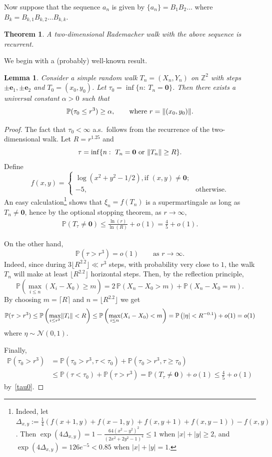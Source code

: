 \documentclass[12pt]{article}
\newtheorem{theorem}{Theorem}
\newtheorem{lemma}{Lemma}
\renewcommand\P{\mathbb{P}}
\newcommand\Z{\mathbb{Z}}
\newcommand\be{\mathbf{e}}
\DeclarePairedDelimiter{\norm}{\lVert}{\rVert}
\begin{document}
Now suppose that the sequence ${a_n}$ is given by $\{a_n\}=B_1 B_2\dots$ where $B_k=B_{k,1} B_{k,2}\dots B_{k,k}$.
\begin{theorem}\label{Tex}
A two-dimensional Rademacher walk with the above sequence is recurrent.
\end{theorem}
We begin with a (probably) well-known result.
\begin{lemma}\label{lemmacube}
Consider a simple random walk $T_n=(X_n,Y_n)$ on $\Z^2$ with steps $\pm\be_1,\pm\be_2$ and $T_0=(x_0,y_0)$. Let $\tau_0=\inf\{n:\ T_n=\mathbf{0}\}$. Then there exists a universal constant $\alpha>0$ such that
$$
\P(\tau_0\le r^3)\ge \alpha, \qquad\text{where }r=\norm{(x_0,y_0)}.
$$
\end{lemma}
\begin{proof}
The fact that $\tau_0<\infty$ a.s.\ follows from the recurrence of the two-dimensional walk. Let $R=r^{1.25}$ and
$$
\tau=\inf\{n:\ T_n=\mathbf{0} \text{ or }\norm{T_n}\ge R\}.
$$
Define
$$
f(x,y)=\begin{cases}\log(x^2+y^2-1/2), \text{if } (x,y)\ne\mathbf{0};\\
-5,&\text{otherwise}.
\end{cases}
$$
An easy calculation\footnote{
Indeed, let $\Delta_{x,y}:=\frac14(f(x+1,y)+f(x-1,y)+f(x,y+1)+f(x,y-1))-f(x,y)$.
Then $\exp(4\Delta_{x,y})=1-\frac{64(x^2-y^2)^2}{(2x^2+2y^2-1)^4}\le 1$ when  $|x|+|y|\ge 2$, and 
$\exp(4\Delta_{x,y})=126 e^{-5}<0.85$  when $|x|+|y|=1$.
}
shows that $\xi_n=f(T_n)$  is a supermartingale as long as $ T_n\ne\mathbf{0}$, hence by the optional stopping theorem, as $r\to\infty$,
\begin{align}\label{tau0}
\P(T_\tau\ne \mathbf{0})\le \frac{\ln(r)}{\ln(R)}+o(1)=\frac45+o(1).    
\end{align}

On the other hand, 
$$
\P(\tau> r^3)=o(1)\qquad\text{as }r\to\infty.
$$
Indeed, since during $3 \lfloor  R^{2.2}\rfloor\ll r^3 $ steps, with probability very close to $1$, the walk $T_n$ will make at least $\lfloor R^{2.2}\rfloor $ horizontal steps. Then, by the reflection principle,
$$
\P(\max_{i\le n} (X_i-X_0)\ge m)=2\, \P(X_n-X_0>m)+\P(X_n-X_0=m).
$$
 By choosing $m=\lceil R\rceil$ and $n=\lfloor R^{2.2}\rfloor$ we get
$$
\P(\tau> r^3)\le \P\left(\max_{i\le r^3} \norm{T_i} <R\right)\le \P\left(\max_{i\le n} (X_i-X_0)<m\right)=\P\left(|\eta|<R^{-0.1}\right)+o(1)=o(1)
$$
where $\eta\sim\mathcal{N}(0,1)$.

Finally,
\begin{align*}
\P(\tau_0>r^3)&=\P(\tau_0>r^3,\tau< \tau_0)+\P(\tau_0>r^3,\tau\ge  \tau_0)
\\
&\le \P(\tau< \tau_0)+\P(\tau>r^3)
=\P(T_\tau\ne \mathbf{0})+o(1)\le\frac45+o(1)
\end{align*}
by~\eqref{tau0}.
\end{proof}
\end{document}
